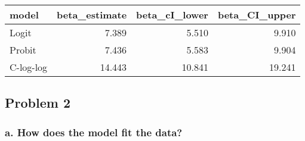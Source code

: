 \documentclass[
]{article}
\begin{document}
\begin{longtable}[]{@{}lrrr@{}}
\toprule
model & beta\_estimate & beta\_cI\_lower &
beta\_CI\_upper\tabularnewline
\midrule
\endhead
Logit & 7.389 & 5.510 & 9.910\tabularnewline
Probit & 7.436 & 5.583 & 9.904\tabularnewline
C-log-log & 14.443 & 10.841 & 19.241\tabularnewline
\bottomrule
\end{longtable}

\hypertarget{problem-2}{%
\subsection{Problem 2}\label{problem-2}}

\hypertarget{a.-how-does-the-model-fit-the-data}{%
\subsubsection{a. How does the model fit the
data?}\label{a.-how-does-the-model-fit-the-data}}
\end{document}
